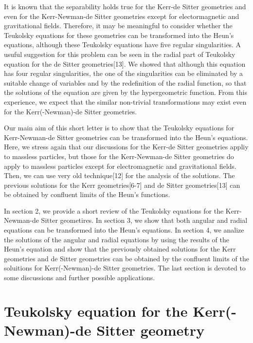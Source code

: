 It is  known that the separability holds true for 
the Kerr-de Sitter geometries and even for the Kerr-Newman-de Sitter 
geometries except for electormagnetic and gravitational fields. 
Therefore, it may be meaningful to 
consider whether the Teukolsky equations for these 
geometries can be transformed into  the Heun's equations, although 
these Teukolsky equations have five regular singularities. 
A usuful suggestion for this problem can be seen in  the 
radial part of Teukolsky equation for the de Sitter geometries[13].  
We showed that although this equation has four regular singularities,  
the one of the singularities can be eliminated by a suitable change 
of variables and by the redefinition of the radial function, so that 
the solutions of the equation are given by the hypergeometric function. 
From this experience, we expect that the similar non-trivial 
transformations may exist  even for the Kerr(-Newman)-de Sitter 
geometries.

Our main aim of this short letter is to show that the Teukolsky 
equations for Kerr-Newman-de Sitter geometries 
can be transformed into the Heun's equations. Here, we stress again 
that our discussions for the Kerr-de Sitter geometries 
appliy to massless particles, but those for the Kerr-Newman-de Sitter 
geometries do apply to massless particles except for electromagnetic 
and gravitational fields. 
Then, we can use very old technique[12] 
for the analysis of the solutions. 
The previous solutions for the Kerr geometries[6-7] and 
de Sitter geometries[13] can be obtained by confluent limits of 
the Heun's functions. 

In section 2, we provide a short review of 
the Teukolsky equations for the Kerr-Newman-de Sitter geometires. 
In section 3, we show that both angular and radial 
equations can be transformed into the Heun's equations. 
In section 4, we analize the solutions of the angular and radial equations 
by using the results of the Heun's equation and show that the previously 
obtained solutions for the Kerr geometries and de Sitter geometries 
can be obtained  by the confluent limits of the soluitions for 
Kerr(-Newman)-de Sitter geometries. 
The last section is devoted to some discussions and further possible 
applications.


\section{Teukolsky equation for the Kerr(-Newman)-de Sitter geometry}
\setcounter{equation}{0}

